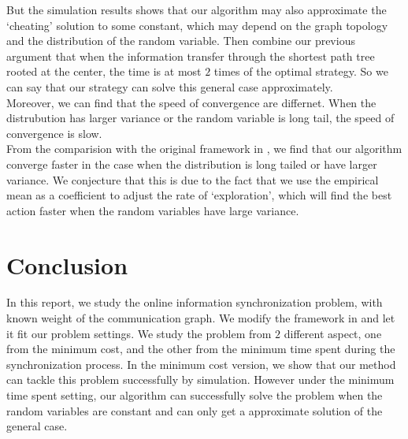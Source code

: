 \documentclass{article}
\theoremstyle{plain}
\theoremstyle{definition}
\theoremstyle{remark}
\begin{document}
    But the simulation results shows that our algorithm may also approximate the `cheating' solution to some constant, which may depend on the graph topology and the distribution of the random variable. Then combine our previous argument that when the information transfer through the shortest path tree rooted at the center, the time is at most $2$ times of the optimal strategy. So we can say that our strategy can solve this general case approximately.\\

    Moreover, we can find that the speed of convergence are differnet. When the distrubution has larger variance or the random variable is long tail, the speed of convergence is slow.\\

    From the comparision with the original framework in \citet{pmlr-v28-chen13a}, we find that our algorithm converge faster in the case when the distribution is long tailed or have larger variance. We conjecture that this is due to the fact that we use the empirical mean as a coefficient to adjust the rate of `exploration', which will find the best action faster when the random variables have large variance.

    \section{Conclusion}
    In this report, we study the online information synchronization problem, with known weight of the communication graph. We modify the framework in \citet{pmlr-v28-chen13a} and let it fit our problem settings. We study the problem from $2$ different aspect, one from the minimum cost, and the other from the minimum time spent during the synchronization process. In the minimum cost version, we show that our method can tackle this problem successfully by simulation. However under the minimum time spent setting, our algorithm can successfully solve the problem when the random variables are constant and can only get a approximate solution of the general case.

    \newpage
    
    

    
    
\end{document}
